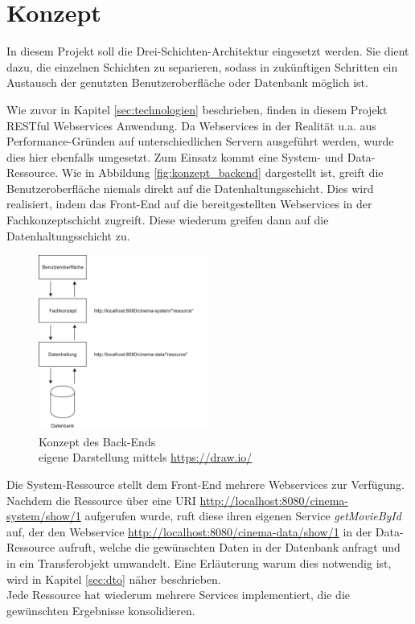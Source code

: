 \section{Konzept}
\label{sec:konzept}
In diesem Projekt soll die Drei-Schichten-Architektur eingesetzt werden.
Sie dient dazu, die einzelnen Schichten zu separieren, sodass in zukünftigen Schritten ein Austausch der genutzten Benutzeroberfläche oder Datenbank möglich ist. 

Wie zuvor in Kapitel \vref{sec:technologien} beschrieben, finden in diesem Projekt \acs{REST}ful Webservices Anwendung.
Da Webservices in der Realität u.a. aus Performance-Gründen auf unterschiedlichen Servern ausgeführt werden, wurde dies hier ebenfalls umgesetzt.
Zum Einsatz kommt eine System- und Data-Ressource.
Wie in Abbildung \vref{fig:konzept_backend} dargestellt ist, greift die Benutzeroberfläche niemals direkt auf die Datenhaltungsschicht.
Dies wird realisiert, indem das Front-End auf die bereitgestellten Webservices in der Fachkonzeptschicht zugreift.
Diese wiederum greifen dann auf die Datenhaltungsschicht zu.

\begin{figure}[ht]
	\centering
	\includegraphics[width=0.5\textwidth]{img/backend/drei-schichten-architektur}
	\captionsetup{format=hang}
	\caption{Konzept des Back-Ends \\ eigene Darstellung mittels \url{https://draw.io/}}
	\label{fig:konzept_backend}
	\end{figure}

Die System-Ressource stellt dem Front-End mehrere Webservices zur Verfügung.
Nachdem die Ressource über eine \acs{URI} \url{http://localhost:8080/cinema-system/show/1} aufgerufen wurde, ruft diese ihren eigenen Service \textit{getMovieById} auf, der den Webservice \url{http://localhost:8080/cinema-data/show/1} in der Data-Ressource aufruft, welche die gewünschten Daten in der Datenbank anfragt und in ein Transferobjekt umwandelt.
Eine Erläuterung warum dies notwendig ist, wird in Kapitel \vref{sec:dto} näher beschrieben. \\
Jede Ressource hat wiederum mehrere Services implementiert, die die gewünschten Ergebnisse konsolidieren.

